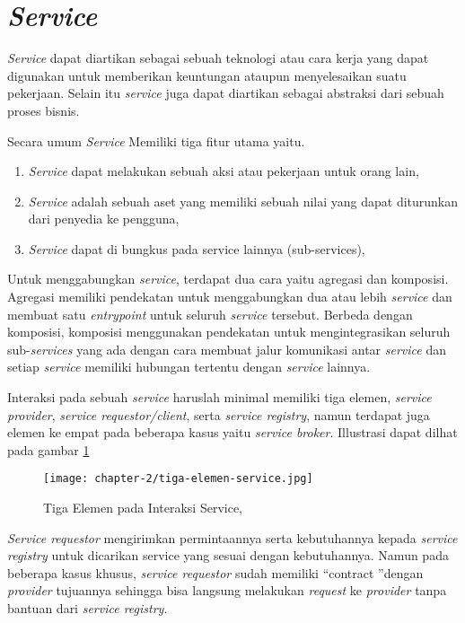 \section{\textit{Service}}

\textit{Service} dapat diartikan sebagai sebuah teknologi atau cara kerja yang dapat digunakan untuk memberikan keuntungan ataupun menyelesaikan suatu pekerjaan. Selain itu \textit{service} juga dapat diartikan sebagai abstraksi dari sebuah proses bisnis. \parencite{osullivan2002}

Secara umum \textit{Service} Memiliki tiga fitur utama yaitu.
\begin{enumerate}
  \item \textit{Service} dapat melakukan sebuah aksi atau pekerjaan untuk orang lain,
  \item \textit{Service} adalah sebuah aset yang memiliki sebuah nilai yang dapat diturunkan dari penyedia ke pengguna,
  \item \textit{Service} dapat di bungkus pada service lainnya (sub-services),
\end{enumerate}

Untuk menggabungkan \textit{service}, terdapat dua cara yaitu agregasi dan komposisi. Agregasi memiliki pendekatan untuk menggabungkan dua atau lebih \textit{service} dan membuat satu \textit{entrypoint} untuk seluruh \textit{service} tersebut. Berbeda dengan komposisi, komposisi menggunakan pendekatan untuk mengintegrasikan seluruh sub-\textit{services} yang ada dengan cara membuat jalur komunikasi antar \textit{service} dan setiap \textit{service} memiliki hubungan tertentu dengan \textit{service} lainnya.

Interaksi pada sebuah \textit{service} haruslah minimal memiliki tiga elemen, \textit{service provider}, \textit{service requestor/client}, serta \textit{\textit{service registry}}, namun terdapat juga elemen ke empat pada beberapa kasus yaitu \textit{service broker}. Illustrasi dapat dilhat pada gambar \ref{fig:tiga-elemen-service}

\begin{figure}[ht]
  \centering
  \texttt{[image: chapter-2/tiga-elemen-service.jpg]}
  \caption{Tiga Elemen pada Interaksi Service, \parencite{abugessaisa2023}}
  \label{fig:tiga-elemen-service}
\end{figure}

\textit{Service requestor} mengirimkan permintaannya serta kebutuhannya kepada \textit{service registry} untuk dicarikan service yang sesuai dengan kebutuhannya. Namun pada beberapa kasus khusus, \textit{service requestor}
sudah memiliki \textquotedblleft contract \textquotedblright dengan \textit{provider} tujuannya sehingga bisa langsung melakukan \textit{request} ke \textit{provider} tanpa bantuan dari \textit{service registry}.

